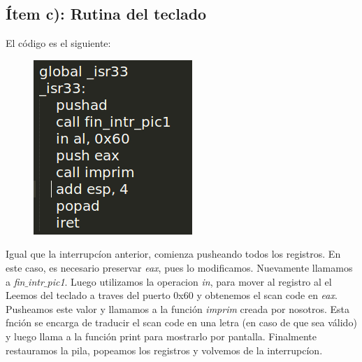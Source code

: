 \subsection{Ítem c): Rutina del teclado}

El código es el siguiente:
\begin{figure}[H]
\begin{center}
  \includegraphics[width=\linewidth]{ejercicio5/rutinaTeclado.png}
\endminipage
\end{center}
\end{figure}

Igual que la interrupcíon anterior, comienza pusheando todos los registros. En este caso, es necesario preservar \textit{eax}, pues lo modificamos. Nuevamente llamamos a \textit{fin$\_$intr$\_$pic1}. Luego utilizamos la operacion \textit{in}, para mover al registro al el 
Leemos del teclado a traves del puerto 0x60 y obtenemos el scan code en \textit{eax}. Pusheamos este valor y llamamos a la función \textit{imprim} creada por nosotros. Esta fnción se encarga de traducir el scan code en una letra (en caso de que sea válido) y luego llama a la función print para mostrarlo por pantalla. Finalmente restauramos la pila, popeamos los registros y volvemos de la interrupcíon.

